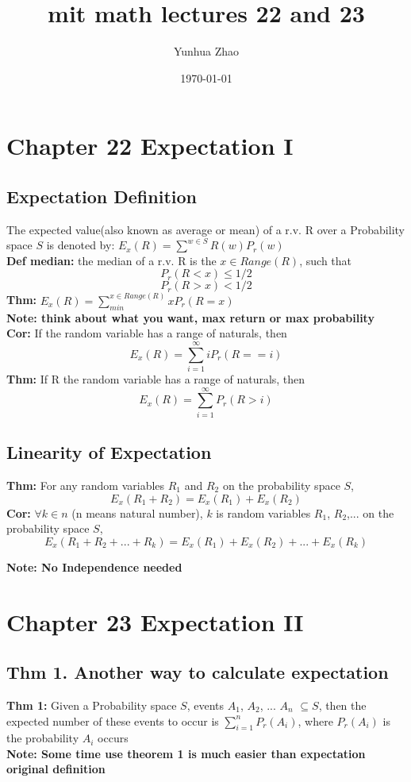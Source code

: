 \documentclass{article}
\title{mit math lectures 22 and 23}
\author{Yunhua Zhao}
\date{\today}
\begin{document}
\maketitle

\section{Chapter 22 Expectation I} 
\subsection{Expectation Definition}
The expected value(also known as average or mean) of a r.v. R over a Probability space $S$ is denoted by:
$E_x(R)=\sum ^{w \in S}R(w)P_r(w)$  \\
\textbf{Def median:} the median of a r.v. R is the $x\in Range(R)$, such that 
$$P_r(R<x)\leqslant 1/2$$
$$P_r(R>x)< 1/2$$
\textbf{Thm:} $E_x(R)=\sum_{min}^{x\in Range(R)}xP_r(R=x)$  \\

\textbf{Note: think about what you want, max return or max probability}\\
\textbf{Cor:} If the random variable has a range of naturals, then 
$$ E_x(R)=\sum_{i=1}^{\infty}iP_r(R==i) $$
\textbf{Thm:} If R the random variable has a range of naturals, then
$$  E_x(R)=\sum_{i=1}^{\infty}P_r(R>i) $$

\subsection{Linearity of Expectation}
\textbf{Thm:} For any random variables $R_1$ and $R_2$ on the probability space $S$, 
$$ E_x(R_1+R_2)=E_x(R_1)+E_x(R_2) $$
\textbf{Cor:} $\forall k\in n$ (n means natural number), $k$ is random variables $R_1$, $R_2$,... on the probability space $S$,
$$ E_x(R_1+R_2+...+R_k)=E_x(R_1)+E_x(R_2)+...+E_x(R_k) $$

\textbf{Note: No Independence needed}\\

\section{Chapter 23 Expectation II} 
\subsection{Thm 1. Another way to calculate expectation}
\textbf{Thm 1:} Given a Probability space $S$, events $A_1$, $A_2$, ... $A_n$ $\subseteq S$, then the expected number of these events to occur is $\sum_{i=1}^{n}P_r(A_i)$, where $P_r(A_i)$ is the probability $A_i$ occurs \\
\textbf{Note: Some time use theorem 1 is much easier than expectation original definition}\\
\end{document}
